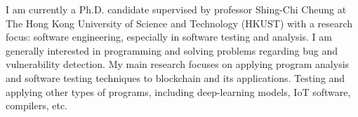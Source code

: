%
%
%
\par{
	I am currently a Ph.D. candidate supervised by professor Shing-Chi Cheung at The Hong Kong University of Science and Technology (HKUST) with a research focus: software engineering, especially in software testing and analysis.
	I am generally interested in programming and solving problems regarding bug and vulnerability detection.
	My main research focuses on applying program analysis and software testing techniques to blockchain and its applications. Testing and applying other types of programs, including deep-learning models, IoT software, compilers, etc.
}
